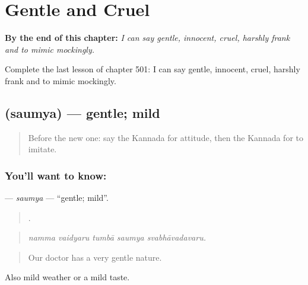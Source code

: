 
\chapter{Gentle and Cruel}
\label{ch:ka-gentle-and-cruel}

\begin{chapteropening}
\textbf{By the end of this chapter:} \emph{I can say gentle, innocent, cruel, harshly frank and to mimic mockingly.}

Complete the last lesson of chapter 501: I can say gentle, innocent, cruel, harshly frank and to mimic mockingly.
\end{chapteropening}

\section[\texorpdfstring{\kn{ಸೌಮ್ಯ} (saumya)}{ಸೌಮ್ಯ (saumya)}]{ (saumya) — gentle; mild}

\label{lesson:KA-C501-saumya}



\begin{quote}
Before the new one: say the Kannada for attitude, then the Kannada for to imitate.
\end{quote}

\subsection*{You'll want to know: }
\textbf{} — \emph{saumya} — \textquotedblleft{}gentle; mild\textquotedblright{}.

\begin{quote}
    .
\end{quote}

\begin{quote}
\emph{namma vaidyaru tumbā saumya svabhāvadavaru.}
\end{quote}

\begin{quote}
Our doctor has a very gentle nature.
\end{quote}

Also mild weather or a mild taste.

